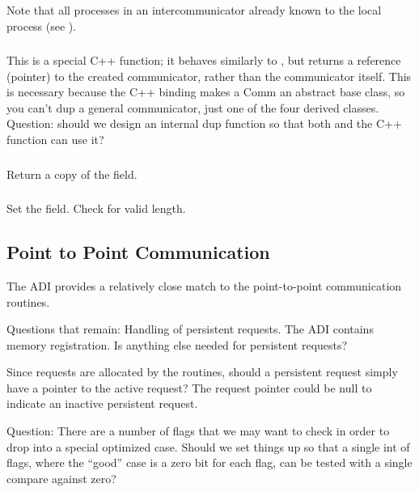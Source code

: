 \documentclass{article}
\begin{document}
Note that all processes in an intercommunicator already known to the
local process (see ).

\subsubsection{}
This is a special C++ function; it behaves similarly to
, but returns a reference (pointer) to the created
communicator, rather than the communicator itself.  This is necessary because
the C++ binding makes a Comm an abstract base class, so you can't dup a
general communicator, just one of the four derived classes.
Question: should we design an internal dup function so that both
 and the C++  function can use it?

\subsubsection{}
Return a copy of the  field.

\subsubsection{}
Set the  field.  Check for valid length.

\subsection{Point to Point Communication}
\label{sec:pt-2-pt}

The ADI provides a relatively close match to the point-to-point
communication routines.  

Questions that remain:  Handling of persistent requests.  The ADI
contains memory registration.  Is anything else needed for persistent
requests? 

Since requests are allocated by the  routines,
should a persistent request simply have a pointer to the active request?  The
request pointer could be null to indicate an inactive persistent request.

Question:  There are a number of flags that we may want to check in order to
drop into a special optimized case.  Should we set things up so that a single
int of flags, where the ``good'' case is a zero bit for each flag, can be
tested with a single compare against zero?
\end{document}
